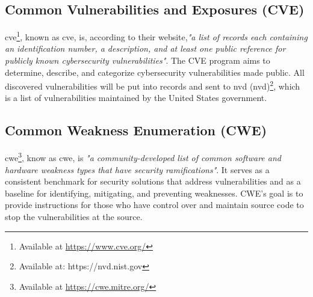 \subsection{Common Vulnerabilities and Exposures (CVE)}
\label{Common Vulnerabilities and Exposures}
\acrlong{cve}\footnote{Available at \url{https://www.cve.org/}}, known as \acrshort{cve}, is, according to their website,\textit{"a list of records each containing an identification number, a description, and at least one public reference for publicly known cybersecurity vulnerabilities"}\cite{CVE}. The CVE program aims to determine, describe, and categorize cybersecurity vulnerabilities made public. All discovered vulnerabilities will be put into records and sent to \acrlong{nvd} (\acrshort{nvd})\footnote{Available at: https://nvd.nist.gov}, which is a list of vulnerabilities maintained by the United States government.

\subsection{Common Weakness Enumeration (CWE)}
\label{cwe}
\acrlong{cwe}\footnote{Available at \url{https://cwe.mitre.org/}}, know as \acrshort{cwe}, is \textit{"a community-developed list of common software and hardware weakness types that have security ramifications"}\cite{CWE}. It serves as a consistent benchmark for security solutions that address vulnerabilities and as a baseline for identifying, mitigating, and preventing weaknesses. CWE's goal is to provide instructions for those who have control over and maintain source code to stop the vulnerabilities at the source. 

